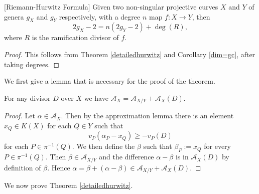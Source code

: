     \begin{cor}\label{hur}[Riemann-Hurwitz Formula]
    Given two non-singular projective curves $X$ and $Y$ of genera $g_X$ and $g_Y$ respectively, with a degree $n$ map $f\colon X \rightarrow Y$, then
        \[
        2g_X - 2 = n(2g_Y -2) + \deg(R),
        \]
    where $R$ is the ramification divisor of $f$.
    \end{cor}
    \begin{proof}
    This follows from Theorem \ref{detailedhurwitz} and Corollary \ref{dim=gc}, after taking degrees.
    \end{proof}


We first give a lemma that is necessary for the proof of the theorem.


    \begin{lem}\label{adelespacelemma}
    For any divisor $D$ over $X$ we have $\mathcal {A}_X = \mathcal{A}_{X/Y} + \mathcal{A}_X(D)$.
    \end{lem}
    \begin{proof}
    Let $\alpha \in \mathcal{A}_X$. Then by the approximation lemma there is an element $x_Q\in K(X)$ for each $Q\in Y$ such that 
        \[
        v_P(\alpha_P - x_Q) \geq -v_P(D)
        \]
    for each $P\in \pi^{-1}(Q)$. 
    We then define the \adele $\beta$ such that $\beta_P := x_Q$ for every $P\in \pi^{-1}(Q)$.
    Then $\beta \in \mathcal{A}_{X/Y}$ and the difference $\alpha - \beta$ is in $\mathcal{A}_X(D)$ by definition of $\beta$.
    Hence $\alpha = \beta + (\alpha - \beta) \in \mathcal{A}_{X/Y} + \mathcal{A}_X(D)$.
    \end{proof}
We now prove Theorem \ref{detailedhurwitz}.

